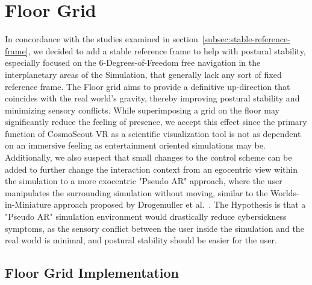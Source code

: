 \section{Floor Grid}\label{sec:floor-grid}

In concordance with the studies examined in section~\ref{subsec:stable-reference-frame}, we decided to add a stable
reference frame to help with postural stability, especially focused on the 6-Degrees-of-Freedom free navigation in
the interplanetary areas of the Simulation, that generally lack any sort of fixed reference frame.
The Floor grid aims to provide a definitive up-direction that coincides with the real world's gravity, thereby
improving postural stability and minimizing sensory conflicts.
While superimposing a grid on the floor may significantly reduce the feeling of presence, we accept this effect since
the primary function of CosmoScout VR as a scientific visualization tool is not as dependent on an immersive feeling
as entertainment oriented simulations may be.
Additionally, we also suspect that small changes to the control scheme can be added to further change the interaction
context from an egocentric view within the simulation to a more exocentric "Pseudo AR" approach, where the user
manipulates the surrounding simulation without moving, similar to the Worlds-in-Miniature approach proposed
by Drogemuller et al.~\cite{Drogemuller2020}.
The Hypothesis is that a "Pseudo AR" simulation environment would drastically reduce cybersickness symptoms, as the
sensory conflict between the user inside the simulation and the real world is minimal, and postural stability should
be easier for the user.

\subsection{Floor Grid Implementation}\label{subsec:floor-grid-implementation}
